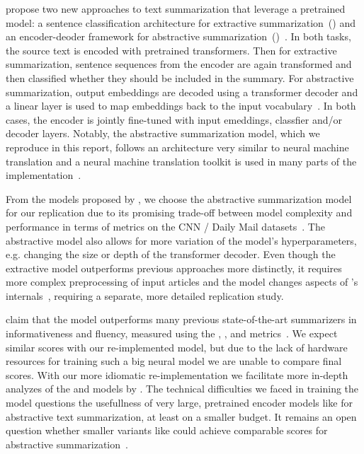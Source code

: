 \citeauthor{LiuL2019} propose two new approaches to text summarization that leverage a pretrained \Bert model: a sentence classification architecture for extractive summarization~(\BertSumExt) and an encoder-deoder framework for abstractive summarization~(\BertSumAbs)~\cite{LiuL2019}.
In both tasks, the source text is encoded with pretrained \Bert transformers. Then for extractive summarization, sentence sequences from the \Bert encoder are again transformed and then classified whether they should be included in the summary.
For abstractive summarization, \Bert output embeddings are decoded using a transformer decoder and a linear layer is used to map embeddings back to the input vocabulary~\cite{LiuL2019}. In both cases, the \Bert encoder is jointly fine-tuned with input emeddings, classfier and/or decoder layers.
Notably, the abstractive summarization model, which we reproduce in this report,
follows an architecture very similar to neural machine translation and a neural machine translation toolkit is used in many parts of the \BertSumAbs implementation~\cite{KleinKDSR2017}.

From the models proposed by \citeauthor{LiuL2019}, we choose the \BertSumAbs abstractive summarization model for our replication due to its promising trade-off between model complexity and performance in terms of \Rouge metrics on the CNN / Daily Mail datasets~\cite{LiuL2019,HermannKGEKSB2015}. The abstractive model also allows for more variation of the model's hyperparameters, e.g. changing the size or depth of the transformer decoder. 
Even though the extractive model \BertSumExt outperforms previous approaches more  distinctly, it requires more complex preprocessing of input articles and the model changes aspects of \Bert's internals~\cite{LiuL2019}, requiring a separate, more detailed replication study.

\citeauthor{LiuL2019} claim that the \BertSumAbs model outperforms many previous state-of-the-art summarizers in informativeness and fluency, measured using the , , and \RougeL metrics~\cite{LiuL2019,Lin2004}.
We expect similar scores with our re-implemented model, but due to the lack of hardware resources for training such a big neural model we are unable to compare final \Rouge scores.
With our more idiomatic re-implementation we facilitate more in-depth analyzes of the \BertSumAbs and \TransformerAbs models by \citeauthor{LiuL2019}.
The technical difficulties we faced in training the \BertSumAbs model questions the usefullness of very large, pretrained encoder models like \Bert for abstractive text summarization, at least on a smaller budget. It remains an open question whether smaller variants like \BertTiny could achieve comparable \Rouge scores for abstractive summarization~\cite{TurcCLT2019}.
